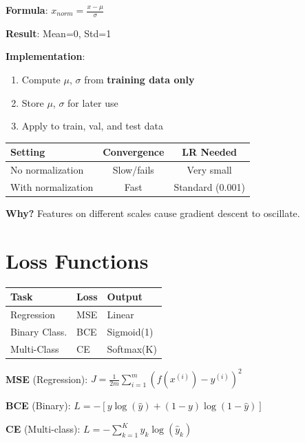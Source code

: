 \documentclass[11pt,a4paper]{article}
\begin{document}
\begin{definitionbox}

\textbf{Formula}: $x_{norm} = \frac{x - \mu}{\sigma}$

\textbf{Result}: Mean=0, Std=1

\textbf{Implementation}:
\begin{enumerate}[leftmargin=*,nosep]
\item Compute $\mu$, $\sigma$ from \textbf{training data only}
\item Store $\mu$, $\sigma$ for later use
\item Apply to train, val, and test data
\end{enumerate}
\end{definitionbox}

\begin{examplebox}

\begin{tabular}{@{}l|cc@{}}
\textbf{Setting} & \textbf{Convergence} & \textbf{LR Needed} \\
\hline
No normalization & Slow/fails & Very small \\
With normalization & Fast & Standard (0.001) \\
\end{tabular}

\textbf{Why?} Features on different scales cause gradient descent to oscillate.
\end{examplebox}

\section{Loss Functions}

\begin{definitionbox}

\begin{tabular}{@{}l|l|l@{}}
\textbf{Task} & \textbf{Loss} & \textbf{Output} \\
\hline
Regression & MSE & Linear \\
Binary Class. & BCE & Sigmoid(1) \\
Multi-Class & CE & Softmax(K) \\
\end{tabular}
\end{definitionbox}

\begin{definitionbox}

\textbf{MSE} (Regression):
$J = \frac{1}{2m}\sum_{i=1}^{m}(f(x^{(i)}) - y^{(i)})^2$

\textbf{BCE} (Binary):
$L = -[y\log(\hat{y}) + (1-y)\log(1-\hat{y})]$

\textbf{CE} (Multi-class):
$L = -\sum_{k=1}^{K} y_k \log(\hat{y}_k)$
\end{definitionbox}
\end{document}
